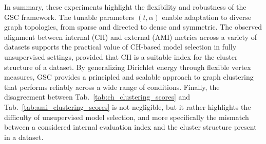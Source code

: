 \documentclass[10pt]{article} %
\newcommand{\GSC}{GSC\xspace}
\begin{document}
In summary, these experiments highlight the flexibility and robustness of the \GSC framework. The tunable parameters $(t,\alpha)$ enable adaptation to diverse graph topologies, from sparse and directed to dense and symmetric. The observed alignment between internal (CH) and external (AMI) metrics across a variety of datasets supports the practical value of CH-based model selection in fully unsupervised settings, provided that CH is a suitable index for the cluster structure of a dataset. By generalizing Dirichlet energy through flexible vertex measures, \GSC provides a principled and scalable approach to graph clustering that performs reliably across a wide range of conditions. Finally, the disagreement between Tab.~\ref{tab:ch_clustering_scores} and Tab.~\ref{tab:ami_clustering_scores} is not negligible, but it rather highlights the difficulty of unsupervised model selection, and more specifically the mismatch between a considered internal evaluation index and the cluster structure present in a dataset.
\end{document}
